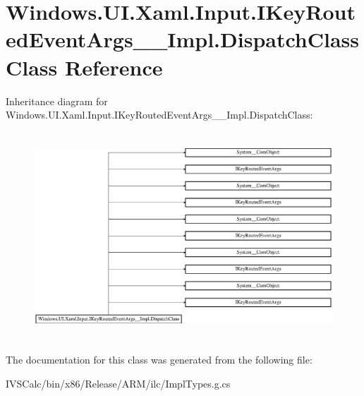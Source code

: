 \hypertarget{class_windows_1_1_u_i_1_1_xaml_1_1_input_1_1_i_key_routed_event_args_____impl_1_1_dispatch_class}{}\section{Windows.\+U\+I.\+Xaml.\+Input.\+I\+Key\+Routed\+Event\+Args\+\_\+\+\_\+\+Impl.\+Dispatch\+Class Class Reference}
\label{class_windows_1_1_u_i_1_1_xaml_1_1_input_1_1_i_key_routed_event_args_____impl_1_1_dispatch_class}
Inheritance diagram for Windows.\+U\+I.\+Xaml.\+Input.\+I\+Key\+Routed\+Event\+Args\+\_\+\+\_\+\+Impl.\+Dispatch\+Class\+:\begin{figure}[H]
\begin{center}
\leavevmode
\includegraphics[height=7.797468cm]{class_windows_1_1_u_i_1_1_xaml_1_1_input_1_1_i_key_routed_event_args_____impl_1_1_dispatch_class}
\end{center}
\end{figure}


The documentation for this class was generated from the following file\+:\begin{DoxyCompactItemize}
\item 
I\+V\+S\+Calc/bin/x86/\+Release/\+A\+R\+M/ilc/Impl\+Types.\+g.\+cs\end{DoxyCompactItemize}
